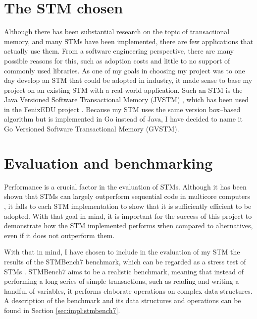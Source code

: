 \documentclass[12pt,a4paper,oneside,openright]{report}
\begin{document}

\section{The STM chosen}
\label{sec:stm-chosen}

Although there has been substantial research on the topic of
transactional memory, and many STMs have been implemented, there are
few applications that actually use them. From a software engineering
perspective, there are many possible reasons for this, such as
adoption costs and little to no support of commonly used libraries. As
one of my goals in choosing my project was to one day develop an STM
that could be adopted in industry, it made sense to base my project on
an existing STM with a real-world application. Such an STM is the Java
Versioned Software Transactional Memory (JVSTM) \cite{jvstm}, which
has been used in the FenixEDU project
\cite{carvalho2008versioned}. Because my STM uses the same version
box--based algorithm \cite{VBox} but is implemented in Go instead of
Java, I have decided to name it Go Versioned Software Transactional
Memory (GVSTM).

\section{Evaluation and benchmarking}
\label{sec:eval-benchm}

Performance is a crucial factor in the evaluation of STMs. Although it
has been shown that STMs can largely outperform sequential code in
multicore computers \cite{MoreThanToy}, it falls to each STM
implementation to show that it is sufficiently efficient to be
adopted. With that goal in mind, it is important for the success of
this project to demonstrate how the STM implemented performs when
compared to alternatives, even if it does not outperform them.

With that in mind, I have chosen to include in the evaluation of my
STM the results of the STMBench7 benchmark, which can be regarded as a
stress test of STMs \cite{STMBench7}. STMBench7 aims to be a realistic
benchmark, meaning that instead of performing a long series of simple
transactions, such as reading and writing a handful of variables, it
performs elaborate operations on complex data structures. A
description of the benchmark and its data structures and operations
can be found in Section \ref{sec:impl:stmbench7}.
\end{document}
